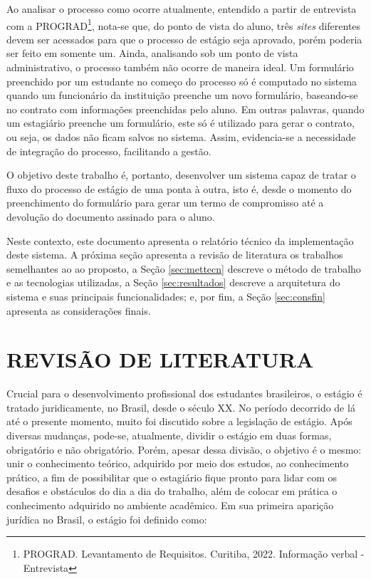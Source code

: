 \documentclass[conference,a4paper,10pt]{IEEETran}
\begin{document}
Ao analisar o processo como ocorre atualmente, entendido a partir de entrevista com a PROGRAD\footnote{PROGRAD. Levantamento de Requisitos. Curitiba, 2022. Informação verbal - Entrevista}, nota-se que, do ponto de vista do aluno, três \textit{sites} diferentes devem ser acessados para que o processo de estágio seja aprovado, porém poderia ser feito em somente um. Ainda, analisando sob um ponto de vista administrativo, o processo também não ocorre de maneira ideal. Um formulário preenchido por um estudante no começo do processo só é computado no sistema quando um funcionário da instituição preenche um novo formulário, baseando-se no contrato com informações preenchidas pelo aluno. Em outras palavras, quando um estagiário preenche um formulário, este só é utilizado para gerar o contrato, ou seja, os dados não ficam salvos no sistema. Assim, evidencia-se a necessidade de integração do processo, facilitando a gestão.

O objetivo deste trabalho é, portanto, desenvolver um sistema capaz de tratar o fluxo
do processo de estágio de uma ponta à outra, isto é, desde o momento do preenchimento do formulário para gerar um termo de compromisso até a devolução do documento assinado para o aluno.

Neste contexto, este documento apresenta o relatório técnico da implementação deste sistema. A próxima seção apresenta a revisão de literatura os trabalhos semelhantes ao ao proposto, a Seção \ref{sec:mettecn} descreve o método de trabalho e as tecnologias utilizadas, a Seção \ref{sec:resultados} descreve a arquitetura do sistema e suas principais funcionalidades; e, por fim, a Seção \ref{sec:consfin} apresenta as considerações finais.

\section{REVISÃO DE LITERATURA}\label{sec:revlit}

Crucial para o desenvolvimento profissional dos estudantes brasileiros, o estágio é tratado juridicamente, no Brasil, desde o século XX. No período decorrido de lá até o presente momento, muito foi discutido sobre a legislação de estágio. Após diversas mudanças, pode-se, atualmente, dividir o estágio em duas formas, obrigatório e não obrigatório. Porém,
apesar dessa divisão, o objetivo é o mesmo: unir o conhecimento teórico, adquirido por meio dos estudos, ao conhecimento prático, a fim de possibilitar que o estagiário fique pronto para lidar com os desafios e obstáculos do dia a dia do trabalho, além de colocar em prática o conhecimento adquirido no ambiente acadêmico. Em sua primeira aparição jurídica no Brasil, o estágio foi definido como: 
\end{document}
